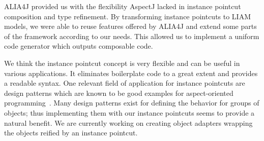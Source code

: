 \documentclass{acm_proc_article-sp}
\begin{document}
ALIA4J provided us with the flexibility AspectJ lacked in instance pointcut composition and type refinement. By transforming instance pointcuts to LIAM models, we were able to reuse features offered by ALIA4J and extend some parts of the framework according to our needs. This allowed us to implement a uniform code generator which outputs composable code.


We think the instance pointcut concept is very flexible and can be useful in various applications. It eliminates boilerplate code to a great extent and provides a readable syntax. One relevant field of application for instance pointcuts are design patterns which are known to be good examples for aspect-oriented programming~\cite{hannemann:oopsla02}. Many design patterns exist for defining the behavior for groups of objects; thus implementing them with our instance pointcuts seems to provide a natural benefit. We are currently working on creating object adapters wrapping the objects reified by an instance pointcut.




\end{document}
